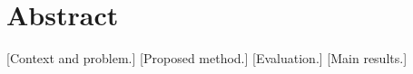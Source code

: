 \chapter*{Abstract}
\onehalfspacing
\vspace{1.0cm}

\begin{otherlanguage}{english}
[Context and problem.] [Proposed method.] [Evaluation.] [Main results.]
\end{otherlanguage}

\bigskip
